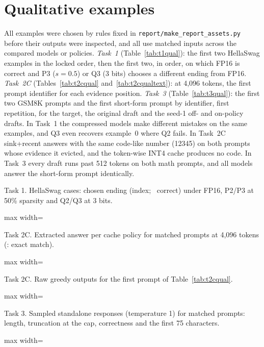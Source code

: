 \documentclass{article}
\newcommand{\tab}[1]{\begin{adjustbox}{max width=\linewidth}\end{adjustbox}}
\begin{document}
\section{Qualitative examples}
All examples were chosen by rules fixed in \texttt{report/make\_report\_assets.py} before their outputs were inspected,
and all use matched inputs across the compared models or policies. \emph{Task~1} (Table~\ref{tab:t1qual}): the first two
HellaSwag examples in the locked order, then the first two, in order, on which FP16 is correct and P3 ($s=0.5$) or Q3
(3 bits) chooses a different ending from FP16. \emph{Task~2C} (Tables~\ref{tab:t2cqual} and~\ref{tab:t2cqualtext}): at
4,096 tokens, the first prompt identifier for each evidence position. \emph{Task~3} (Table~\ref{tab:t3qual}): the first two
GSM8K prompts and the first short-form prompt by identifier, first repetition, for the target, the original draft and
the seed-1 off- and on-policy drafts. In Task~1 the compressed models make different mistakes on the same examples, and
Q3 even recovers example~0 where Q2 fails. In Task~2C sink+recent answers with the same code-like number (12345) on both
prompts whose evidence it evicted, and the token-wise INT4 cache produces no code. In Task~3 every draft runs past 512 tokens on
both math prompts, and all models answer the short-form prompt identically.

\begin{table}[!htb]
\centering\footnotesize
\caption{Task 1. HellaSwag cases: chosen ending (index; \checkmark\ correct) under FP16, P2/P3 at 50\% sparsity and
Q2/Q3 at 3 bits.}
\label{tab:t1qual}
\tab{t1_qual}
\end{table}

\begin{table}[!htb]
\centering\footnotesize
\caption{Task 2C. Extracted answer per cache policy for matched prompts at 4,096 tokens (\checkmark: exact match).}
\label{tab:t2cqual}
\tab{t2c_qual}
\end{table}

\begin{table}[!htb]
\centering\footnotesize
\caption{Task 2C. Raw greedy outputs for the first prompt of Table~\ref{tab:t2cqual}.}
\label{tab:t2cqualtext}
\tab{t2c_qual_text}
\end{table}

\begin{table}[!htb]
\centering\footnotesize
\caption{Task 3. Sampled standalone responses (temperature 1) for matched prompts: length, truncation at the cap,
correctness and the first 75 characters.}
\label{tab:t3qual}
\tab{t3_qual}
\end{table}
\end{document}
